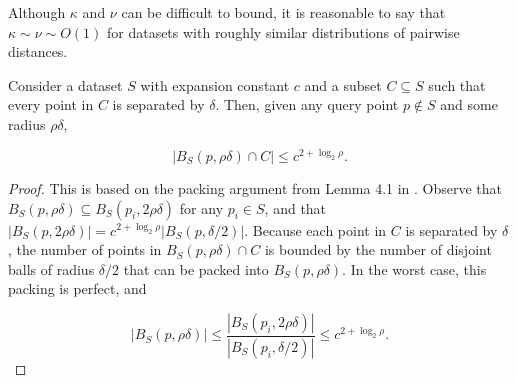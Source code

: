 Although $\kappa$ and $\nu$ can be difficult to bound, it is reasonable to
say that $\kappa \sim \nu \sim O(1)$ for datasets with roughly similar
distributions of pairwise distances.

\begin{lemma}
Consider a dataset $S$ with expansion constant $c$ and a subset $C \subseteq S$
such that every point in $C$ is separated by $\delta$.  Then, given any query
point $p \not\in S$ and some radius $\rho \delta$,

\vspace*{-0.7em}
\begin{equation}
| B_S(p, \rho \delta) \cap C | \le c^{2 + \log_2 \rho}.
\end{equation}
\vspace*{-1.1em}
\label{lem:packing}
\end{lemma}

\vspace*{-1em}
\begin{proof}
This is based on the packing argument from Lemma 4.1 in \cite{langford2006}.
Observe that $B_S(p, \rho \delta) \subseteq B_S(p_i, 2 \rho \delta)$ for any
$p_i \in S$, and that $| B_S(p, 2 \rho \delta) | = c^{2 + \log_2 \rho} |
B_S(p, \delta / 2) |$.  Because each point in $C$ is separated by $\delta$, the
number of points in $B_S(p, \rho \delta) \cap C$ is
bounded by the number of disjoint balls of radius $\delta / 2$ that can be
packed into $B_S(p, \rho \delta)$.  In the worst case, this packing is
perfect, and

\vspace*{-0.7em}
\begin{equation}
|B_S(p, \rho \delta)| \le \frac{|B_S(p_i, 2 \rho \delta)|}{|B_S(p_i, \delta
/ 2)|} \le c^{2 + \log_2 \rho}.
\end{equation}\end{proof}
\vspace*{-2.2em}
